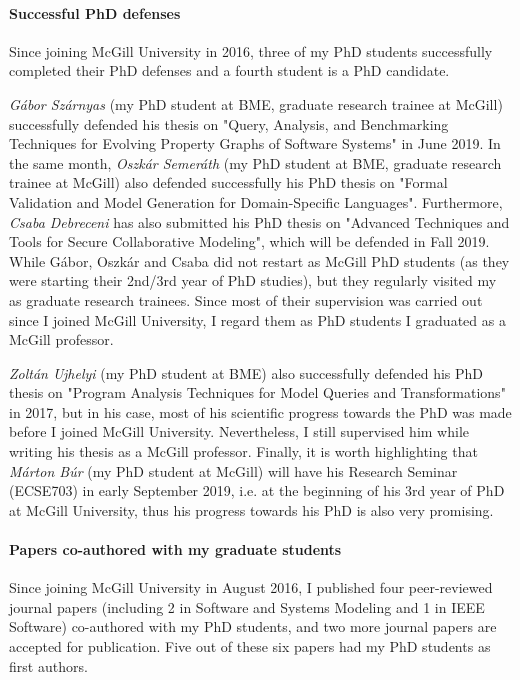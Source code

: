 \documentclass[a4paper,11pt]{report}
\begin{document}
\paragraph{Successful PhD defenses}
Since joining McGill University in 2016, three of my PhD students successfully completed their PhD defenses and a fourth student is a PhD candidate. 

\emph{Gábor Szárnyas} (my PhD student at BME, graduate research trainee at McGill) successfully defended his thesis on "Query, Analysis, and Benchmarking Techniques for Evolving Property Graphs of Software Systems" in June 2019. In the same month, \emph{Oszkár Semeráth} (my PhD student at BME, graduate research trainee at McGill) also defended successfully his PhD thesis on "Formal Validation and Model Generation for Domain-Specific Languages". Furthermore, \emph{Csaba Debreceni} has also submitted his PhD thesis on "Advanced Techniques and Tools for Secure Collaborative Modeling", which will be defended in Fall 2019. 
While Gábor, Oszkár and Csaba did not restart as McGill PhD students (as they were starting their 2nd/3rd year of PhD studies), but they regularly visited my as graduate research trainees. Since most of their supervision was carried out since I joined McGill University, I regard them as PhD students I graduated as a McGill professor. 

\emph{Zoltán Ujhelyi} (my PhD student at BME) also successfully defended his PhD thesis on "Program Analysis Techniques for Model Queries and Transformations" in 2017, but in his case, most of his scientific progress towards the PhD was made before I joined McGill University. Nevertheless, I still supervised him while writing his thesis as a McGill professor.  Finally, it is worth highlighting that \emph{Márton Búr} (my PhD student at McGill) will have his Research Seminar (ECSE703) in early September 2019, i.e. at the beginning of his 3rd year of PhD at McGill University, thus his progress towards his PhD is also very promising.

\paragraph{Papers co-authored with my graduate students}
Since joining McGill University in August 2016, I published four peer-reviewed journal papers (including 2 in Software and Systems Modeling and 1 in IEEE Software) co-authored with my PhD students,  and two more journal papers are accepted for publication. Five out of these six papers had my PhD students as first authors. 
\end{document}
